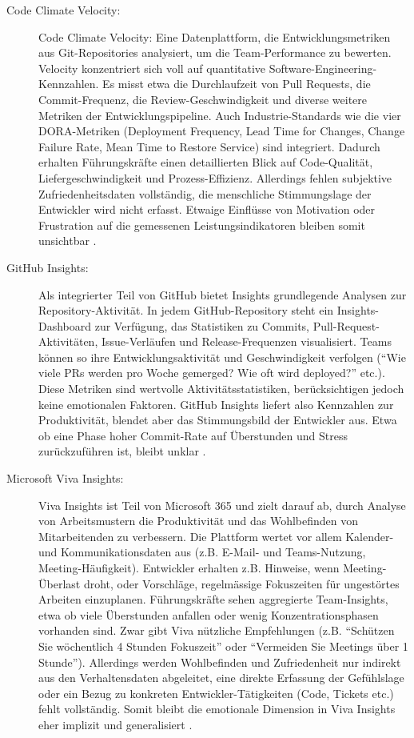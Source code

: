 \documentclass[12pt,a4paper]{report}
\begin{document}
\begin{description}
  \item[Code Climate Velocity:] Code Climate Velocity: Eine Datenplattform, die Entwicklungsmetriken aus Git-Repositories analysiert,
    um die Team-Performance zu bewerten. Velocity konzentriert sich voll auf quantitative Software-Engineering-Kennzahlen. Es misst
    etwa die Durchlaufzeit von Pull Requests, die Commit-Frequenz, die Review-Geschwindigkeit und diverse weitere Metriken der
    Entwicklungspipeline. Auch Industrie-Standards wie die vier DORA-Metriken (Deployment Frequency, Lead Time for Changes, Change
    Failure Rate, Mean Time to Restore Service) sind integriert. Dadurch erhalten Führungskräfte einen detaillierten Blick auf
    Code-Qualität, Liefergeschwindigkeit und Prozess-Effizienz. Allerdings fehlen subjektive Zufriedenheitsdaten vollständig, die
    menschliche Stimmungslage der Entwickler wird nicht erfasst. Etwaige Einflüsse von Motivation oder Frustration auf die
    gemessenen Leistungsindikatoren bleiben somit unsichtbar \cite{infoworld_codeclimate_2023}.

  \item[GitHub Insights:] Als integrierter Teil von GitHub bietet Insights grundlegende Analysen zur Repository-Aktivität. In jedem
    GitHub-Repository steht ein Insights-Dashboard zur Verfügung, das Statistiken zu Commits, Pull-Request-Aktivitäten,
    Issue-Verläufen und Release-Frequenzen visualisiert. Teams können so ihre Entwicklungsaktivität und Geschwindigkeit verfolgen
    (“Wie viele PRs werden pro Woche gemerged? Wie oft wird deployed?” etc.). Diese Metriken sind wertvolle Aktivitätsstatistiken,
    berücksichtigen jedoch keine emotionalen Faktoren. GitHub Insights liefert also Kennzahlen zur Produktivität, blendet aber das
    Stimmungsbild der Entwickler aus. Etwa ob eine Phase hoher Commit-Rate auf Überstunden und Stress zurückzuführen ist, bleibt
    unklar \cite{axify_git_2025}.

  \item[Microsoft Viva Insights:] Viva Insights ist Teil von Microsoft 365 und zielt darauf ab, durch Analyse von Arbeitsmustern die
    Produktivität und das Wohlbefinden von Mitarbeitenden zu verbessern. Die Plattform wertet vor allem Kalender- und
    Kommunikationsdaten aus (z.B. E-Mail- und Teams-Nutzung, Meeting-Häufigkeit). Entwickler erhalten z.B. Hinweise, wenn
    Meeting-Überlast droht, oder Vorschläge, regelmässige Fokuszeiten für ungestörtes Arbeiten einzuplanen. Führungskräfte sehen
    aggregierte Team-Insights, etwa ob viele Überstunden anfallen oder wenig Konzentrationsphasen vorhanden sind. Zwar gibt Viva
    nützliche Empfehlungen (z.B. “Schützen Sie wöchentlich 4 Stunden Fokuszeit” oder “Vermeiden Sie Meetings über 1 Stunde”).
    Allerdings werden Wohlbefinden und Zufriedenheit nur indirekt aus den Verhaltensdaten abgeleitet, eine direkte Erfassung der
    Gefühlslage oder ein Bezug zu konkreten Entwickler-Tätigkeiten (Code, Tickets etc.) fehlt vollständig. Somit bleibt die
    emotionale Dimension in Viva Insights eher implizit und generalisiert \cite{zachminers_introduction_nodate}.
\end{description}
\end{document}

